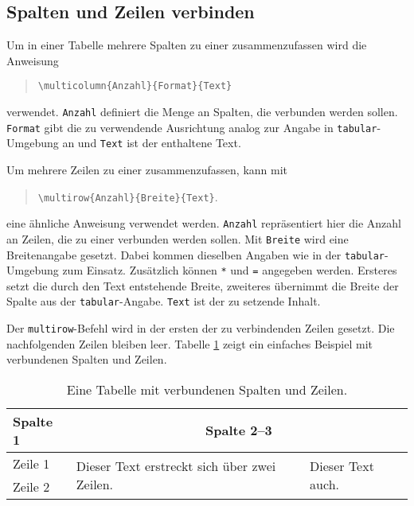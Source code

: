\subsection{Spalten und Zeilen verbinden}

Um in einer Tabelle mehrere Spalten zu einer zusammenzufassen wird die Anweisung
%
\begin{quote}
	\verb!\multicolumn{Anzahl}{Format}{Text}!
\end{quote}
%
verwendet. \texttt{Anzahl} definiert die Menge an Spalten, die verbunden werden sollen.
\texttt{Format} gibt die zu verwendende Ausrichtung analog zur Angabe in \texttt{tabular}-Umgebung an und
\texttt{Text} ist der enthaltene Text.

Um mehrere Zeilen zu einer zusammenzufassen, kann mit
%
\begin{quote}
	\verb!\multirow{Anzahl}{Breite}{Text}!.
\end{quote}
%
eine ähnliche Anweisung verwendet werden. \texttt{Anzahl} repräsentiert hier die Anzahl an Zeilen, die zu
einer verbunden werden sollen. Mit \texttt{Breite} wird eine Breitenangabe gesetzt. Dabei kommen dieselben
Angaben wie in der \texttt{tabular}-Umgebung zum Einsatz. Zusätzlich können \texttt{*} und \texttt{=} angegeben
werden. Ersteres setzt die durch den Text entstehende Breite, zweiteres übernimmt die Breite der Spalte aus
der \texttt{tabular}-Angabe. \texttt{Text} ist der zu setzende Inhalt.

Der \verb|multirow|-Befehl wird in der ersten der zu verbindenden Zeilen gesetzt. Die nachfolgenden Zeilen bleiben
leer. Tabelle \ref{tab:multi-column-row-tabelle} zeigt ein einfaches Beispiel mit verbundenen Spalten und Zeilen.

\begin{table}
	\caption{Eine Tabelle mit verbundenen Spalten und Zeilen.}
	\label{tab:multi-column-row-tabelle}
	\centering
	\setlength{\tabcolsep}{10pt} %
	\def\arraystretch{1.25}      %
	\begin{tabular}{@{}lll@{}}
		\toprule
		Spalte 1 & \multicolumn{2}{c}{Spalte 2--3}                                                                      \\
		\midrule
		Zeile 1  & \multirow{2}{4cm}{Dieser Text erstreckt sich über zwei Zeilen.} & \multirow{2}{*}{Dieser Text auch.} \\
	    Zeile 2  &                                                                 &                                    \\
		\bottomrule
	\end{tabular}
\end{table}

